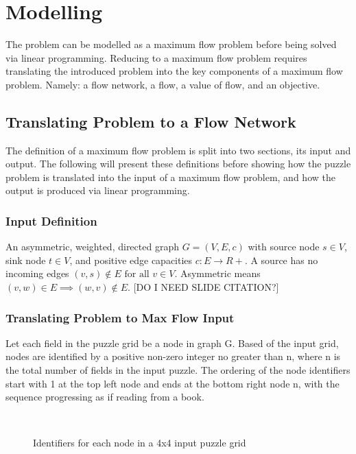\documentclass{homeworg}
\begin{document}
\newpage
\section{Modelling}
The problem can be modelled as a maximum flow problem before being solved via linear programming.
Reducing to a maximum flow problem requires translating the introduced problem into the key components of a maximum flow problem. Namely: a flow network, a flow, a value of flow, and an objective. 
\subsection{Translating Problem to a Flow Network}
The definition of a maximum flow problem is split into two sections, its input and output. The following will present these definitions before showing how the puzzle problem is translated into the input of a maximum flow problem, and how the output is produced via linear programming.
\subsubsection{Input Definition}
An asymmetric, weighted, directed graph \(G = (V, E, c)\) with source node \(s \in V\), sink node \(t \in V\), and positive edge capacities \(c:E\rightarrow R+\). A source has no incoming edges \((v,s) \notin E \text{ for all } v \in V\). Asymmetric means \((v,w) \in E \implies (w,v) \notin E\). [DO I NEED SLIDE CITATION?]
\subsubsection{Translating Problem to Max Flow Input}
Let each field in the puzzle grid be a node in graph G. Based of the input grid, nodes are identified by a positive non-zero integer no greater than n, where n is the total number of fields in the input puzzle. The ordering of the node identifiers start with 1 at the top left node and ends at the bottom right node n, with the sequence progressing as if reading from a book.\\

\begin{figure}[h]
        \centering
        \\
        \caption{Identifiers for each node in a 4x4 input puzzle grid}
\end{figure}
\end{document}
